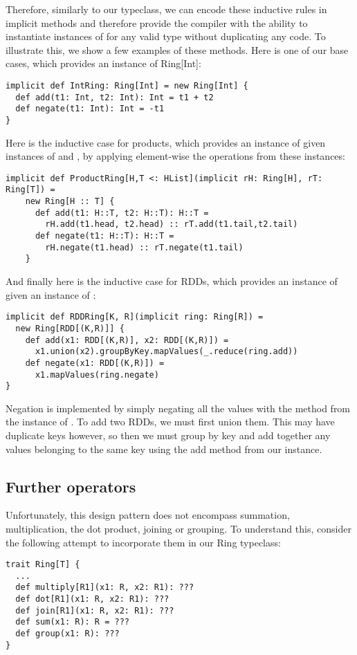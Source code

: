 Therefore, similarly to our  typeclass, we can encode these inductive rules in implicit methods and therefore provide the compiler with the ability to instantiate instances of  for any valid type  without duplicating any code. To illustrate this, we show a few examples of these methods. Here is one of our base cases, which provides an instance of Ring[Int]:
\vs\begin{lstlisting}
implicit def IntRing: Ring[Int] = new Ring[Int] {
  def add(t1: Int, t2: Int): Int = t1 + t2
  def negate(t1: Int): Int = -t1
}
\end{lstlisting}\vs
Here is the inductive case for products, which provides an instance of  given instances of  and , by applying element-wise the operations from these instances:
\vs\begin{lstlisting}
implicit def ProductRing[H,T <: HList](implicit rH: Ring[H], rT: Ring[T]) =
    new Ring[H :: T] {
      def add(t1: H::T, t2: H::T): H::T =
        rH.add(t1.head, t2.head) :: rT.add(t1.tail,t2.tail)
      def negate(t1: H::T): H::T =
        rH.negate(t1.head) :: rT.negate(t1.tail)
    }
\end{lstlisting}\vs
And finally here is the inductive case for RDDs, which provides an instance of  given an instance of :
\vs\begin{lstlisting}
implicit def RDDRing[K, R](implicit ring: Ring[R]) =
  new Ring[RDD[(K,R)]] {
    def add(x1: RDD[(K,R)], x2: RDD[(K,R)]) =
      x1.union(x2).groupByKey.mapValues(_.reduce(ring.add))
    def negate(x1: RDD[(K,R)]) =
      x1.mapValues(ring.negate)
}
\end{lstlisting}\vs

Negation is implemented by simply negating all the values with the method from the instance of . To add two RDDs, we must first union them. This may have duplicate keys however, so then we must group by key and add together any values belonging to the same key using the add method from our  instance.

\subsection{Further operators}
Unfortunately, this design pattern does not encompass summation, multiplication, the dot product, joining or grouping. To understand this, consider the following attempt to incorporate them in our Ring typeclass:
\vs\begin{lstlisting}
trait Ring[T] {
  ...
  def multiply[R1](x1: R, x2: R1): ???
  def dot[R1](x1: R, x2: R1): ???
  def join[R1](x1: R, x2: R1): ???
  def sum(x1: R): R = ???
  def group(x1: R): ???
}
\end{lstlisting}\vs

